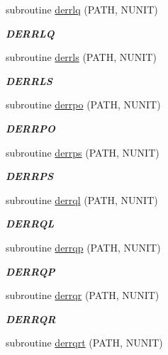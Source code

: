 \begin{DoxyCompactItemize}
subroutine \hyperlink{group__double__lin_ga982ba776f732f2321cda47f6a1933412}{derrlq} (P\+A\+T\+H, N\+U\+N\+I\+T)
\begin{DoxyCompactList}\small\item\em {\bfseries D\+E\+R\+R\+L\+Q} \end{DoxyCompactList}\item 
subroutine \hyperlink{group__double__lin_ga1d4e64ec31e8abe907549155f9f328a2}{derrls} (P\+A\+T\+H, N\+U\+N\+I\+T)
\begin{DoxyCompactList}\small\item\em {\bfseries D\+E\+R\+R\+L\+S} \end{DoxyCompactList}\item 
subroutine \hyperlink{group__double__lin_ga645e4701a7aae356addfea92d625ae7b}{derrpo} (P\+A\+T\+H, N\+U\+N\+I\+T)
\begin{DoxyCompactList}\small\item\em {\bfseries D\+E\+R\+R\+P\+O} \end{DoxyCompactList}\item 
subroutine \hyperlink{group__double__lin_ga323e6436b0b10537c96eb7ac3e871285}{derrps} (P\+A\+T\+H, N\+U\+N\+I\+T)
\begin{DoxyCompactList}\small\item\em {\bfseries D\+E\+R\+R\+P\+S} \end{DoxyCompactList}\item 
subroutine \hyperlink{group__double__lin_ga60566d309768aedb3f8e1b725a59b7de}{derrql} (P\+A\+T\+H, N\+U\+N\+I\+T)
\begin{DoxyCompactList}\small\item\em {\bfseries D\+E\+R\+R\+Q\+L} \end{DoxyCompactList}\item 
subroutine \hyperlink{group__double__lin_ga549b207c52ef06ceca91d4ff832b72a2}{derrqp} (P\+A\+T\+H, N\+U\+N\+I\+T)
\begin{DoxyCompactList}\small\item\em {\bfseries D\+E\+R\+R\+Q\+P} \end{DoxyCompactList}\item 
subroutine \hyperlink{group__double__lin_gae835dfa51943b6cddd0d991c0525737a}{derrqr} (P\+A\+T\+H, N\+U\+N\+I\+T)
\begin{DoxyCompactList}\small\item\em {\bfseries D\+E\+R\+R\+Q\+R} \end{DoxyCompactList}\item 
subroutine \hyperlink{group__double__lin_gaa827cfaa7f69845ebf6ac490a981146e}{derrqrt} (P\+A\+T\+H, N\+U\+N\+I\+T)

\end{DoxyCompactItemize}
